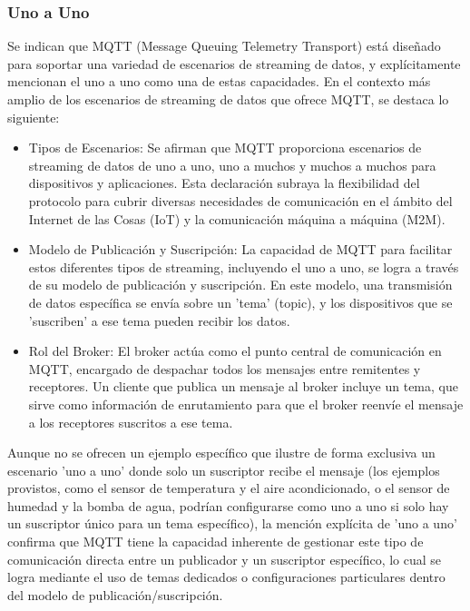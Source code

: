 \documentclass{report}
\begin{document}
\subsubsection{Uno a Uno}
Se  indican que MQTT (Message Queuing Telemetry Transport) está diseñado para soportar una variedad de escenarios de streaming 
de datos, y explícitamente mencionan el uno a uno como una de estas capacidades.
En el contexto más amplio de los escenarios de streaming de datos que ofrece MQTT, se destaca lo siguiente:
\begin{itemize}
    \item Tipos de Escenarios: Se  afirman que MQTT proporciona escenarios de streaming de datos de uno a uno, uno a muchos y 
    muchos a muchos para dispositivos y aplicaciones. Esta declaración subraya la flexibilidad del protocolo para cubrir diversas necesidades 
    de comunicación en el ámbito del Internet de las Cosas (IoT) y la comunicación máquina a máquina (M2M).
    \item Modelo de Publicación y Suscripción: La capacidad de MQTT para facilitar estos diferentes tipos de streaming, incluyendo el uno a uno, 
    se logra a través de su modelo de publicación y suscripción. En este modelo, una transmisión de datos específica se envía sobre 
    un 'tema' (topic), y los dispositivos que se 'suscriben' a ese tema pueden recibir los datos.
    \item Rol del Broker: El broker actúa como el punto central de comunicación en MQTT, encargado de despachar todos los mensajes entre 
    remitentes y receptores. Un cliente que publica un mensaje al broker incluye un tema, que sirve como información de enrutamiento para 
    que el broker reenvíe el mensaje a los receptores suscritos a ese tema.
\end{itemize}
Aunque no se ofrecen un ejemplo específico que ilustre de forma exclusiva un escenario 'uno a uno' donde solo un suscriptor recibe 
el mensaje (los ejemplos provistos, como el sensor de temperatura y el aire acondicionado, o el sensor de humedad y la bomba de agua, 
podrían configurarse como uno a uno si solo hay un suscriptor único para un tema específico), la mención explícita de 'uno a uno' 
confirma que MQTT tiene la capacidad inherente de gestionar este tipo de comunicación directa entre un publicador y un suscriptor 
específico, lo cual se logra mediante el uso de temas dedicados o configuraciones particulares dentro del 
modelo de publicación/suscripción.
\end{document}
